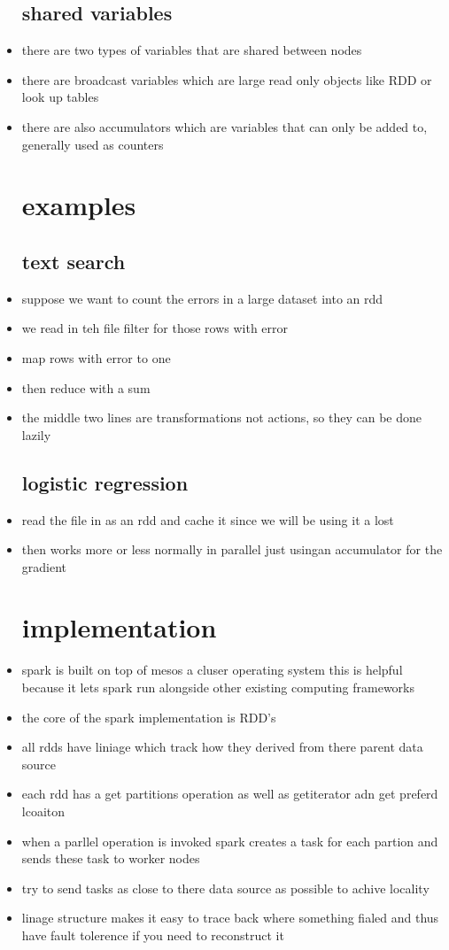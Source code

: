 \documentclass{article}
\begin{document}
\begin{itemize}
\subsection*{shared variables}
\item there are two types of variables that are shared between nodes 
\item there are broadcast variables which are large read only objects like RDD or look up tables 
\item there are also accumulators which are variables that can only be added to, generally used as counters
\section*{examples}
\subsection*{text search}
\item suppose we want to count the errors in a large dataset into an rdd
\item we read in teh file filter for those rows with error 
\item map rows with error to one 
\item then reduce with a sum
\item the middle two lines are transformations not actions, so they can be done lazily
\subsection*{logistic regression}
\item read the file in as an rdd and cache it since we will be using it a lost
\item then works more or less normally in parallel just usingan accumulator for the gradient 
\section*{implementation}
\item spark is built on top of mesos a cluser operating system this is helpful because it lets spark run alongside other existing computing frameworks
\item the core of the spark implementation is RDD's 
\item all rdds have liniage which track how they derived from there parent data source 
\item each rdd has a get partitions operation as well as getiterator adn get preferd lcoaiton 
\item when a parllel operation is invoked spark creates a task for each partion and sends these task to worker nodes
\item try to send tasks as close to there data source as possible to achive locality
\item linage structure makes it easy to trace back where something fialed and thus have fault tolerence if you need to reconstruct it 

\end{itemize}
\end{document}
